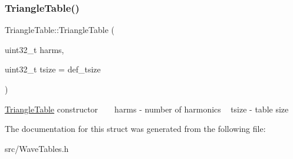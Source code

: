 \subsubsection{\texorpdfstring{Triangle\+Table()}{TriangleTable()}}
{\footnotesize\ttfamily Triangle\+Table\+::\+Triangle\+Table (\begin{DoxyParamCaption}\item[{uint32\+\_\+t}]{harms,  }\item[{uint32\+\_\+t}]{tsize = {\ttfamily def\+\_\+tsize} }\end{DoxyParamCaption})\hspace{0.3cm}{\ttfamily [inline]}}

\hyperlink{struct_triangle_table}{Triangle\+Table} constructor ~\newline
~\newline
harms -\/ number of harmonics ~\newline
tsize -\/ table size ~\newline


The documentation for this struct was generated from the following file\+:\begin{DoxyCompactItemize}
\item 
src/Wave\+Tables.\+h\end{DoxyCompactItemize}
